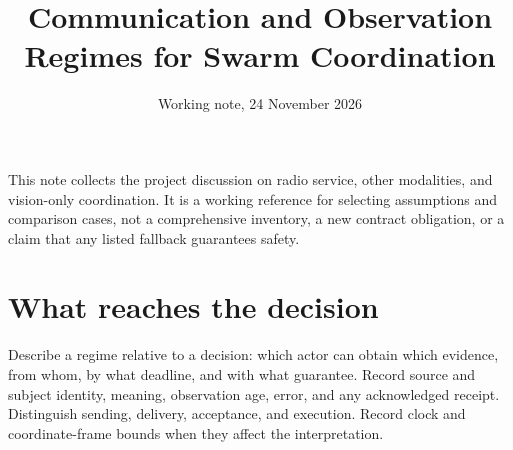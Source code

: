 \documentclass[11pt]{article}
\title{Communication and Observation Regimes for Swarm Coordination}
\author{}
\date{Working note, 24 November 2026}
\begin{document}
\maketitle

This note collects the project discussion on radio service, other modalities, and vision-only coordination. It is a working reference for selecting assumptions and comparison cases, not a comprehensive inventory, a new contract obligation, or a claim that any listed fallback guarantees safety.

\section{What reaches the decision}
Describe a regime relative to a decision: which actor can obtain which evidence, from whom, by what deadline, and with what guarantee. Record source and subject identity, meaning, observation age, error, and any acknowledged receipt. Distinguish sending, delivery, acceptance, and execution. Record clock and coordinate-frame bounds when they affect the interpretation.
\end{document}
